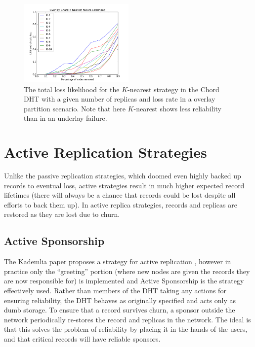 	\begin{figure}[h!]
		\includegraphics[width=0.5\textwidth]{figs/overlay_chord_nearest}
		\caption{The total loss likelihood for the $K$-nearest strategy in the Chord DHT with a given number of replicas and loss rate in a overlay partition scenario. Note that here $K$-nearest shows less reliability than in an underlay failure.}
	\end{figure}
	
	
	
	\section{Active Replication Strategies}
	
	Unlike the passive replication strategies, which doomed even highly backed up records to eventual loss, active strategies result in much higher expected record lifetimes (there will always be a chance that records could be lost despite all efforts to back them up).
	In active replica strategies, records and replicas are restored as they are lost due to churn.
	
	
	\subsection{Active Sponsorship}
	
	The Kademlia paper proposes a strategy for active replication \cite{kademlia}, however in practice only the ``greeting'' portion (where new nodes are given the records they are now responsible for) is implemented and Active Sponsorship is the strategy effectively used.
	Rather than members of the DHT taking any actions for ensuring reliability, the DHT behaves as originally specified and acts only as dumb storage.
	To ensure that a record survives churn, a sponsor outside the network periodically re-stores the record and replicas in the network.
	The ideal is that this solves the problem of reliability by placing it in the hands of the users, and that critical records will have reliable sponsors.
	
